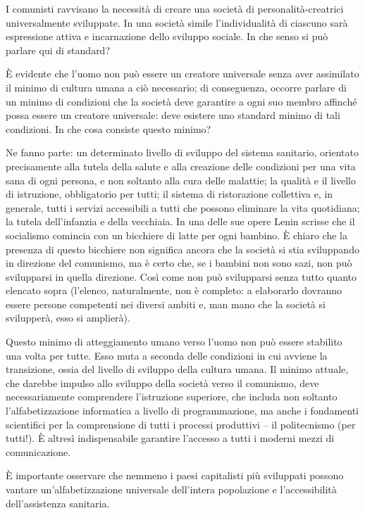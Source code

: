 \documentclass[12pt,a4paper,openany]{book}
\begin{document}
I comunisti ravvisano la necessità di creare una società di personalità-creatrici universalmente sviluppate. In una società simile l'individualità di ciascuno sarà espressione attiva e incarnazione dello sviluppo sociale. In che senso si può parlare qui di standard?

È evidente che l'uomo non può essere un creatore universale senza aver assimilato il minimo di cultura umana a ciò necessario; di conseguenza, occorre parlare di un minimo di condizioni che la società deve garantire a ogni suo membro affinché possa essere un creatore universale: deve esistere uno standard minimo di tali condizioni. In che cosa consiste questo minimo?

Ne fanno parte: un determinato livello di sviluppo del sistema sanitario, orientato precisamente alla tutela della salute e alla creazione delle condizioni per una vita sana di ogni persona, e non soltanto alla cura delle malattie; la qualità e il livello di istruzione, obbligatorio per tutti; il sistema di ristorazione collettiva e, in generale, tutti i servizi accessibili a tutti che possono eliminare la vita quotidiana; la tutela dell'infanzia e della vecchiaia. In una delle sue opere Lenin scrisse che il socialismo comincia con un bicchiere di latte per ogni bambino. È chiaro che la presenza di questo bicchiere non significa ancora che la società si stia sviluppando in direzione del comunismo, ma è certo che, se i bambini non sono sazi, non può svilupparsi in quella direzione. Così come non può svilupparsi senza tutto quanto elencato sopra (l'elenco, naturalmente, non è completo: a elaborarlo dovranno essere persone competenti nei diversi ambiti e, man mano che la società si svilupperà, esso si amplierà).

Questo minimo di atteggiamento umano verso l'uomo non può essere stabilito una volta per tutte. Esso muta a seconda delle condizioni in cui avviene la transizione, ossia del livello di sviluppo della cultura umana. Il minimo attuale, che darebbe impulso allo sviluppo della società verso il comunismo, deve necessariamente comprendere l'istruzione superiore, che includa non soltanto l'alfabetizzazione informatica a livello di programmazione, ma anche i fondamenti scientifici per la comprensione di tutti i processi produttivi – il politecnismo (per tutti!). È altresì indispensabile garantire l'accesso a tutti i moderni mezzi di comunicazione.

È importante osservare che nemmeno i paesi capitalisti più sviluppati possono vantare un'alfabetizzazione universale dell'intera popolazione e l'accessibilità dell'assistenza sanitaria.
\end{document}
